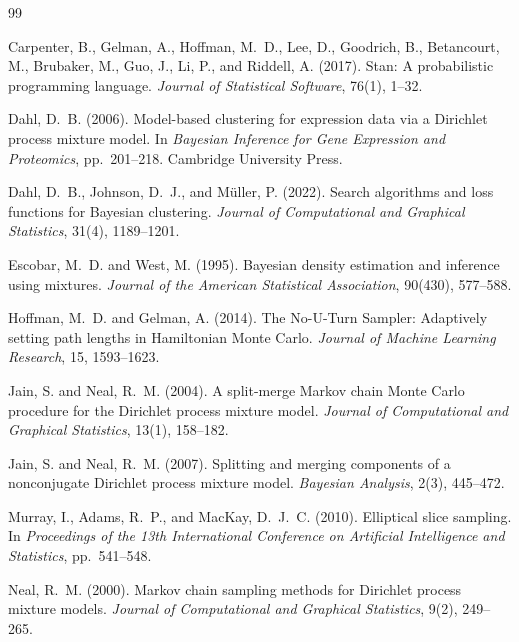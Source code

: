 \documentclass[12pt, a4paper]{article}
\theoremstyle{remark}
\begin{document}
\begin{thebibliography}{99}

Carpenter, B., Gelman, A., Hoffman, M.~D., Lee, D., Goodrich, B.,
Betancourt, M., Brubaker, M., Guo, J., Li, P., and Riddell, A. (2017).
Stan: A probabilistic programming language.
\textit{Journal of Statistical Software}, 76(1), 1--32.

Dahl, D.~B. (2006).
Model-based clustering for expression data via a Dirichlet process
mixture model.
In \textit{Bayesian Inference for Gene Expression and Proteomics},
pp.~201--218. Cambridge University Press.

Dahl, D.~B., Johnson, D.~J., and M\"{u}ller, P. (2022).
Search algorithms and loss functions for Bayesian clustering.
\textit{Journal of Computational and Graphical Statistics},
31(4), 1189--1201.

Escobar, M.~D. and West, M. (1995).
Bayesian density estimation and inference using mixtures.
\textit{Journal of the American Statistical Association},
90(430), 577--588.

Hoffman, M.~D. and Gelman, A. (2014).
The No-U-Turn Sampler: Adaptively setting path lengths in Hamiltonian
Monte Carlo.
\textit{Journal of Machine Learning Research}, 15, 1593--1623.

Jain, S. and Neal, R.~M. (2004).
A split-merge Markov chain Monte Carlo procedure for the Dirichlet
process mixture model.
\textit{Journal of Computational and Graphical Statistics},
13(1), 158--182.

Jain, S. and Neal, R.~M. (2007).
Splitting and merging components of a nonconjugate Dirichlet process
mixture model.
\textit{Bayesian Analysis}, 2(3), 445--472.

Murray, I., Adams, R.~P., and MacKay, D.~J.~C. (2010).
Elliptical slice sampling.
In \textit{Proceedings of the 13th International Conference on
Artificial Intelligence and Statistics}, pp.~541--548.

Neal, R.~M. (2000).
Markov chain sampling methods for Dirichlet process mixture models.
\textit{Journal of Computational and Graphical Statistics},
9(2), 249--265.


\end{thebibliography}
\end{document}
